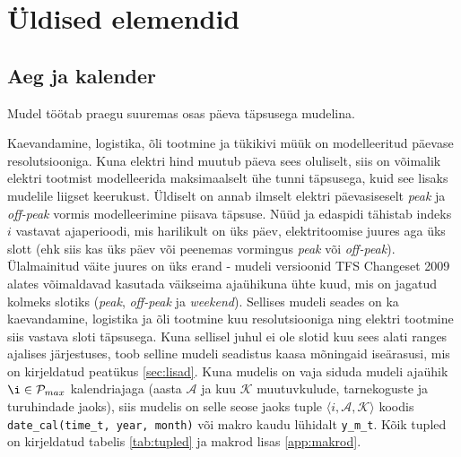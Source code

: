 \documentclass[10pt,a4paper]{article}
\begin{document}
\section{Üldised elemendid}
\subsection{Aeg ja kalender}
Mudel töötab praegu suuremas osas päeva täpsusega mudelina.

Kaevandamine, logistika, õli tootmine ja tükikivi müük on modelleeritud päevase resolutsiooniga. Kuna elektri hind muutub päeva sees oluliselt, siis on võimalik elektri tootmist modelleerida maksimaalselt ühe tunni täpsusega, kuid see lisaks mudelile liigset keerukust. Üldiselt on annab ilmselt elektri  päevasiseselt \emph{peak} ja \emph{off-peak} vormis modelleerimine piisava täpsuse. Nüüd ja edas\-pidi tähistab indeks $i$ vastavat ajaperioodi, mis harilikult on üks päev, elektritoomise juures aga üks slott (ehk siis kas üks päev või peenemas vormingus \emph{peak} või \emph{off-peak}).
Ülalmainitud väite juures on üks erand - mudeli versioonid TFS Changeset 2009 alates võimaldavad kasutada väikseima ajaühikuna  ühte kuud, mis on jagatud kolmeks slotiks (\emph{peak}, \emph{off-peak} ja \emph{weekend}). Sellises mudeli seades on ka kaevandamine, logistika ja õli tootmine kuu resolutsiooniga ning elektri tootmine siis vastava sloti täpsusega. Kuna sellisel juhul ei ole slotid kuu sees alati ranges ajalises järjestuses, toob selline mudeli seadistus kaasa mõningaid iseärasusi, mis on kirjeldatud peatükus \ref{sec:lisad}. Kuna mudelis on vaja siduda mudeli ajaühik $\i \in \mathcal{P}_{max}$ kalendriajaga (aasta $\mathcal{A}$ ja kuu $\mathcal{K}$ muutuvkulude, tarnekoguste ja turuhindade jaoks), siis mudelis on selle seose jaoks tuple $\langle i, \mathcal{A}, \mathcal{K} \rangle$ koodis \texttt{date\_cal(time\_t, year, month)} või makro kaudu lühidalt \texttt{y\_m\_t}. Kõik tupled on kirjeldatud tabelis \ref{tab:tupled} ja makrod lisas \ref{app:makrod}.
\end{document}
